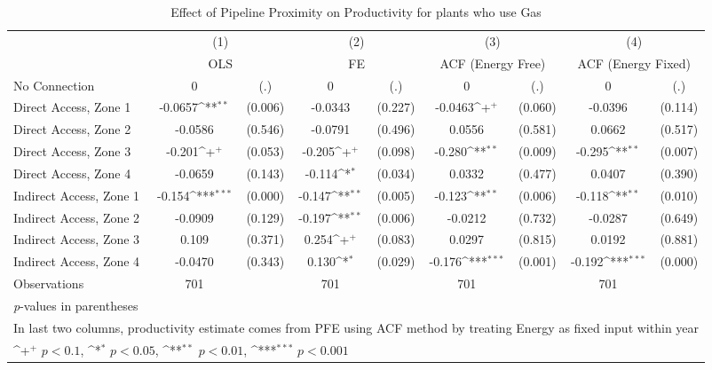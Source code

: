 \begin{table}[htbp]\centering
\def\sym#1{\ifmmode^{#1}\else\(^{#1}\)\fi}
\caption{Effect of Pipeline Proximity on Productivity for plants who use Gas}
\begin{tabular}{l*{4}{cc}}
\toprule
                    &\multicolumn{2}{c}{(1)}           &\multicolumn{2}{c}{(2)}           &\multicolumn{2}{c}{(3)}           &\multicolumn{2}{c}{(4)}           \\
                    &\multicolumn{2}{c}{OLS}           &\multicolumn{2}{c}{FE}            &\multicolumn{2}{c}{ACF (Energy Free)}&\multicolumn{2}{c}{ACF (Energy Fixed)}\\
\midrule
No Connection       &           0         &         (.)&           0         &         (.)&           0         &         (.)&           0         &         (.)\\
Direct Access, Zone 1&     -0.0657\sym{**} &     (0.006)&     -0.0343         &     (0.227)&     -0.0463\sym{+}  &     (0.060)&     -0.0396         &     (0.114)\\
Direct Access, Zone 2&     -0.0586         &     (0.546)&     -0.0791         &     (0.496)&      0.0556         &     (0.581)&      0.0662         &     (0.517)\\
Direct Access, Zone 3&      -0.201\sym{+}  &     (0.053)&      -0.205\sym{+}  &     (0.098)&      -0.280\sym{**} &     (0.009)&      -0.295\sym{**} &     (0.007)\\
Direct Access, Zone 4&     -0.0659         &     (0.143)&      -0.114\sym{*}  &     (0.034)&      0.0332         &     (0.477)&      0.0407         &     (0.390)\\
Indirect Access, Zone 1&      -0.154\sym{***}&     (0.000)&      -0.147\sym{**} &     (0.005)&      -0.123\sym{**} &     (0.006)&      -0.118\sym{**} &     (0.010)\\
Indirect Access, Zone 2&     -0.0909         &     (0.129)&      -0.197\sym{**} &     (0.006)&     -0.0212         &     (0.732)&     -0.0287         &     (0.649)\\
Indirect Access, Zone 3&       0.109         &     (0.371)&       0.254\sym{+}  &     (0.083)&      0.0297         &     (0.815)&      0.0192         &     (0.881)\\
Indirect Access, Zone 4&     -0.0470         &     (0.343)&       0.130\sym{*}  &     (0.029)&      -0.176\sym{***}&     (0.001)&      -0.192\sym{***}&     (0.000)\\
\midrule
Observations        &         701         &            &         701         &            &         701         &            &         701         &            \\
\bottomrule
\multicolumn{9}{l}{\footnotesize \textit{p}-values in parentheses}\\
\multicolumn{9}{l}{\footnotesize In last two columns, productivity estimate comes from PFE using ACF method by treating Energy as fixed input within year}\\
\multicolumn{9}{l}{\footnotesize \sym{+} \(p<0.1\), \sym{*} \(p<0.05\), \sym{**} \(p<0.01\), \sym{***} \(p<0.001\)}\\
\end{tabular}
\end{table}
